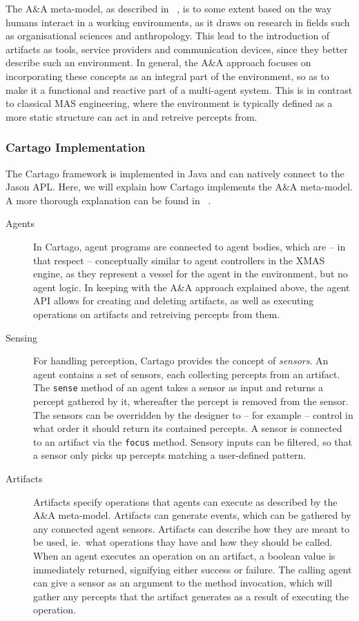 The A\&A meta-model, as described in ~\cite{Ricci08}, is to some
extent based on the way humans interact in a working environments,
as it draws on research in fields such as organisational sciences
and anthropology. This lead to the introduction of artifacts as tools,
service providers and communication devices, since they better describe
such an environment. In general, the A\&A approach focuses on incorporating
these concepts as an integral part of the environment, so as to make
it a functional and reactive part of a multi-agent system. This is
in contrast to classical MAS engineering, where the environment is
typically defined as a more static structure can act in and retreive
percepts from.


\subsubsection*{Cartago Implementation}

The Cartago framework is implemented in Java and can natively connect
to the Jason APL. Here, we will explain how Cartago implements the
A\&A meta-model. A more thorough explanation can be found in ~\cite{Ricci11}.
\begin{description}
\item [{Agents}] In Cartago, agent programs are connected to agent bodies,
which are -- in that respect -- conceptually similar to agent controllers
in the XMAS engine, as they represent a vessel for the agent in the
environment, but no agent logic. In keeping with the A\&A approach
explained above, the agent API allows for creating and deleting artifacts,
as well as executing operations on artifacts and retreiving percepts
from them. 
\item [{Sensing}] For handling perception, Cartago provides the concept
of \emph{sensors}. An agent contains a set of sensors, each collecting
percepts from an artifact. The \texttt{sense} method of an agent takes
a sensor as input and returns a percept gathered by it, whereafter
the percept is removed from the sensor. The sensors can be overridden
by the designer to -- for example -- control in what order it should
return its contained percepts. A sensor is connected to an artifact
via the \texttt{focus} method. Sensory inputs can be filtered, so
that a sensor only picks up percepts matching a user-defined pattern.
\item [{Artifacts}] Artifacts specify operations that agents can execute
as described by the A\&A meta-model. Artifacts can generate events,
which can be gathered by any connected agent sensors. Artifacts can
describe how they are meant to be used, ie.\ what operations thay
have and how they should be called. When an agent executes an operation
on an artifact, a boolean value is immediately returned, signifying
either success or failure. The calling agent can give a sensor as
an argument to the method invocation, which will gather any percepts
that the artifact generates as a result of executing the operation.
\end{description}

